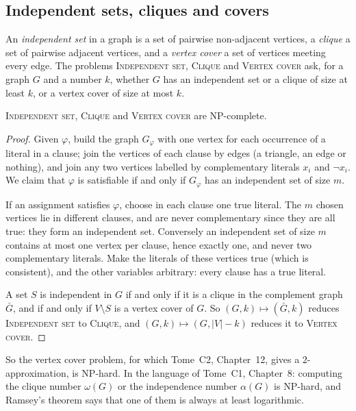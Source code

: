 \subsection*{Independent sets, cliques and covers}

An \emph{independent set} in a graph is a set of pairwise non-adjacent vertices, a \emph{clique} a set of pairwise adjacent vertices, and a \emph{vertex cover} a set of vertices meeting every edge. The problems \textup{\textsc{Independent set}}, \textup{\textsc{Clique}} and \textup{\textsc{Vertex cover}} ask, for a graph $G$ and a number $k$, whether $G$ has an independent set or a clique of size at least $k$, or a vertex cover of size at most $k$.

\begin{theorem}\label{thm:isclique}
\textup{\textsc{Independent set}}, \textup{\textsc{Clique}} and \textup{\textsc{Vertex cover}} are NP-complete.
\end{theorem}

\begin{proof}
Given $\varphi$, build the graph $G_\varphi$ with one vertex for each occurrence of a literal in a clause; join the vertices of each clause by edges (a triangle, an edge or nothing), and join any two vertices labelled by complementary literals $x_i$ and $\neg x_i$. We claim that $\varphi$ is satisfiable if and only if $G_\varphi$ has an independent set of size $m$.

If an assignment satisfies $\varphi$, choose in each clause one true literal. The $m$ chosen vertices lie in different clauses, and are never complementary since they are all true: they form an independent set. Conversely an independent set of size $m$ contains at most one vertex per clause, hence exactly one, and never two complementary literals. Make the literals of these vertices true (which is consistent), and the other variables arbitrary: every clause has a true literal.

A set $S$ is independent in $G$ if and only if it is a clique in the complement graph $\bar G$, and if and only if $V\setminus S$ is a vertex cover of $G$. So $(G,k)\mapsto(\bar G,k)$ reduces \textup{\textsc{Independent set}} to \textup{\textsc{Clique}}, and $(G,k)\mapsto(G,|V|-k)$ reduces it to \textup{\textsc{Vertex cover}}.
\end{proof}

So the vertex cover problem, for which Tome~C2, Chapter~12, gives a $2$-approximation, is NP-hard. In the language of Tome~C1, Chapter~8: computing the clique number $\omega(G)$ or the independence number $\alpha(G)$ is NP-hard, and Ramsey's theorem says that one of them is always at least logarithmic.

